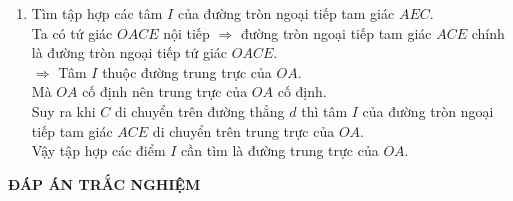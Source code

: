\begin{ex}
{\begin{enumerate}
		\item Tìm tập hợp các tâm $I$ của đường tròn ngoại tiếp tam giác $AEC$.\\
		Ta có tứ giác $OACE$ nội tiếp $\Rightarrow$ đường tròn ngoại tiếp tam giác $ACE$ chính là đường tròn ngoại tiếp tứ giác $OACE$.\\
		$\Rightarrow$ Tâm $I$ thuộc đường trung trực của $OA$.\\
		Mà $OA$ cố định nên trung trực của $OA$ cố định.\\
		Suy ra khi $C$ di chuyển trên đường thẳng $d$ thì tâm $I$ của đường tròn ngoại tiếp tam giác $ACE$ di chuyển trên trung trực của $OA$.\\
		Vậy tập hợp các điểm $I$ cần tìm là đường trung trực của $OA$.
	\end{enumerate}
}
\end{ex}


\newpage
\begin{center}
	\textbf{ĐÁP ÁN TRẮC NGHIỆM}
\end{center}
\begin{multicols}{10}
	
\end{multicols}